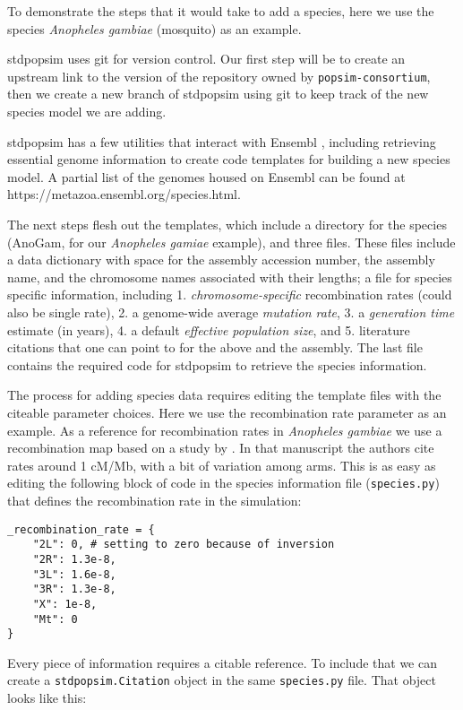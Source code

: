 \documentclass[hidelinks]{article}
\begin{document}
To demonstrate the steps that it would take to add a species, here we
use the species \emph{Anopheles gambiae} (mosquito) as an example.

stdpopsim uses git for version control. Our first step will be to create an upstream
link to the version of the repository owned by
\texttt{popsim-consortium}, then we create a new branch of stdpopsim
using git to keep track of the new species model we are adding.

stdpopsim has a few utilities that interact with Ensembl \citep{ensembl2021},
including retrieving essential genome information to create code
templates for building a new species model. A partial list of the
genomes housed on Ensembl can be found at
https://metazoa.ensembl.org/species.html.

The next steps flesh out the templates, which include a directory for
the species (AnoGam, for our \emph{Anopheles gamiae} example), and three
files. These files include a data dictionary with space for the assembly
accession number, the assembly name, and the
chromosome names associated with their lengths; a file for species
specific information, including 1. \emph{chromosome-specific}
recombination rates (could also be single rate), 2. a genome-wide
average \emph{mutation rate}, 3. a \emph{generation time} estimate (in
years), 4. a default \emph{effective population size}, and 5. literature
citations that one can point to for the above and the assembly. The last
file contains the required code for stdpopsim to retrieve the species
information.

The process for adding species data requires editing the template files
with the citeable parameter choices. Here we use the recombination rate
parameter as an example. As a reference for recombination rates in
\emph{Anopheles gambiae} we use a recombination map based on a study
by \citep{Pombi2006}. In that manuscript
the authors cite rates around 1 cM/Mb, with a bit of variation among
arms. This is as easy as editing the following block of code in the
species information file (\texttt{species.py}) that defines the
recombination rate in the simulation:

\begin{verbatim}
_recombination_rate = {
    "2L": 0, # setting to zero because of inversion
    "2R": 1.3e-8,
    "3L": 1.6e-8,
    "3R": 1.3e-8,
    "X": 1e-8,
    "Mt": 0
}
\end{verbatim}

Every piece of information requires a citable reference. To include that we
can create a \texttt{stdpopsim.Citation} object in the same
\texttt{species.py} file. That object looks like this:
\end{document}

